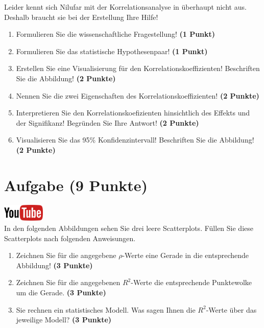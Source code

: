 \documentclass[a4paper, 9pt]{scrartcl}\usepackage[]{graphicx}\usepackage[]{xcolor}
\begin{document}
Leider kennt sich Nilufar mit der Korrelationsanalyse in \Rlogo überhaupt nicht aus. Deshalb braucht sie bei der Erstellung Ihre Hilfe!

\begin{enumerate}
  \item Formulieren Sie die wissenschaftliche Fragestellung! \textbf{(1 Punkt)}
  \item Formulieren Sie das statistische Hypothesenpaar! \textbf{(1 Punkt)}
\item Erstellen Sie eine Visualisierung für den Korrelationskoeffizienten! Beschriften Sie die Abbildung! \textbf{(2 Punkte)}
\item Nennen Sie die zwei Eigenschaften des Korrelationskoeffizienten! \textbf{(2 Punkte)}
\item Interpretieren Sie den Korrelationskoefizienten hinsichtlich des
  Effekts und der Signifikanz! Begründen Sie Ihre Antwort! \textbf{(2 Punkte)}
\item Visualisieren Sie das 95\% Konfidenzintervall! Beschriften Sie die Abbildung! \textbf{(2 Punkte)} 
\end{enumerate} 
\clearpage

\section{Aufgabe \hfill (9 Punkte)}

\hfill\href{https://youtu.be/fB6nF4dxodA}{\includegraphics[width =
  2cm]{img/youtube}}\\[1Ex]


In den folgenden Abbildungen sehen Sie drei leere Scatterplots. F{\"u}llen Sie diese
Scatterplots nach folgenden Anweisungen.

\begin{enumerate}
\item Zeichnen Sie f{\"u}r die angegebene $\rho$-Werte eine Gerade in die
  entsprechende Abbildung! \textbf{(3 Punkte)}
\item Zeichnen Sie f{\"u}r die angegebenen $R^2$-Werte die entsprechende
  Punktewolke um die Gerade. \textbf{(3 Punkte)}
\item Sie rechnen ein statistisches Modell. Was sagen Ihnen die $R^2$-Werte
  {\"u}ber das jeweilige Modell? \textbf{(3 Punkte)}
\end{enumerate}
\end{document}
